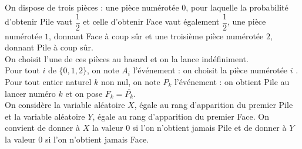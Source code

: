 \documentclass[11pt]{article}%
\begin{document}
\noindent
On dispose de trois pièces : une pièce numérotée $0$, pour laquelle la
probabilité d'obtenir Pile vaut $\dfrac{1}{2}$ et celle d'obtenir Face
vaut également $\dfrac{1}{2}$, une pièce numérotée $1$, donnant Face à
coup sûr et une troisième pièce numérotée $2$, donnant Pile à coup
sûr.\\
On choisit l'une de ces pièces au hasard et on la lance
indéfiniment.\\
Pour tout $i$ de $\{0, 1, 2\}$, on note $A_i$ l'événement : \og on
choisit la pièce numérotée $i$ \fg{}.\\
Pour tout entier naturel $k$ non nul, on note $P_k$ l'événement : \og
on obtient Pile au lancer numéro $k$ \fg{} et on pose $F_k =
\overline{P_k}$.\\
On considère la variable aléatoire $X$, égale au rang d'apparition du
premier Pile et la variable aléatoire $Y$, égale au rang d'apparition
du premier Face. On convient de donner à $X$ la valeur $0$ si l'on
n'obtient jamais Pile et de donner à $Y$ la valeur $0$ si l'on
n'obtient jamais Face.
\end{document}
